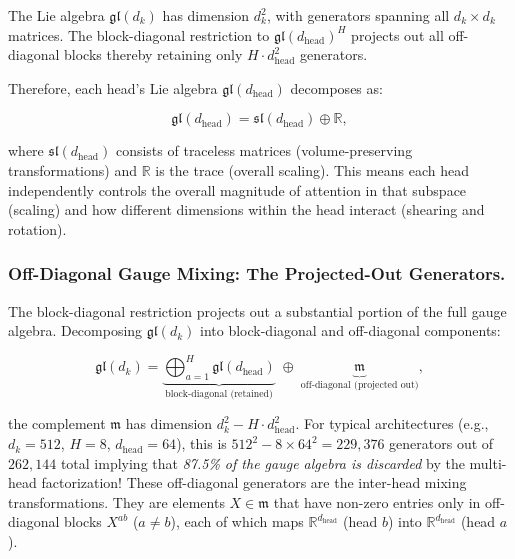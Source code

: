 \documentclass[twoside,11pt]{article}
\begin{document}
The Lie algebra $\mathfrak{gl}(d_k)$ has dimension $d_k^2$, with generators spanning all $d_k \times d_k$ matrices. The block-diagonal restriction to $\mathfrak{gl}(d_{\text{head}})^H$ projects out all off-diagonal blocks thereby retaining only $H \cdot d_{\text{head}}^2$ generators.

Therefore, each head's Lie algebra $\mathfrak{gl}(d_{\text{head}})$ decomposes as:

\begin{equation}
\mathfrak{gl}(d_{\text{head}}) = \mathfrak{sl}(d_{\text{head}}) \oplus \mathbb{R},
\end{equation}

where $\mathfrak{sl}(d_{\text{head}})$ consists of traceless matrices (volume-preserving transformations) and $\mathbb{R}$ is the trace (overall scaling). This means each head independently controls the overall magnitude of attention in that subspace (scaling) and how different dimensions within the head interact (shearing and rotation).

\subsubsection{Off-Diagonal Gauge Mixing: The Projected-Out Generators.}
\label{sec:off_diagonal_mixing}

The block-diagonal restriction projects out a substantial portion of the full gauge algebra. Decomposing $\mathfrak{gl}(d_k)$ into block-diagonal and off-diagonal components:

\begin{equation}
\mathfrak{gl}(d_k) = \underbrace{\bigoplus_{a=1}^{H} \mathfrak{gl}(d_{\text{head}})}_{\text{block-diagonal (retained)}} \;\oplus\; \underbrace{\mathfrak{m}}_{\text{off-diagonal (projected out)}},
\label{eq:lie_algebra_decomposition}
\end{equation}

the complement $\mathfrak{m}$ has dimension $d_k^2 - H \cdot d_{\text{head}}^2$. For typical architectures (e.g., $d_k = 512$, $H = 8$, $d_{\text{head}} = 64$), this is $512^2 - 8 \times 64^2 = 229{,}376$ generators out of $262{,}144$ total implying that \emph{87.5\% of the gauge algebra is discarded} by the multi-head factorization! These off-diagonal generators are the inter-head mixing transformations. They are elements $X \in \mathfrak{m}$ that have non-zero entries only in off-diagonal blocks $X^{ab}$ ($a \neq b$), each of which maps $\mathbb{R}^{d_{\text{head}}}$ (head $b$) into $\mathbb{R}^{d_{\text{head}}}$ (head $a$).
\end{document}
